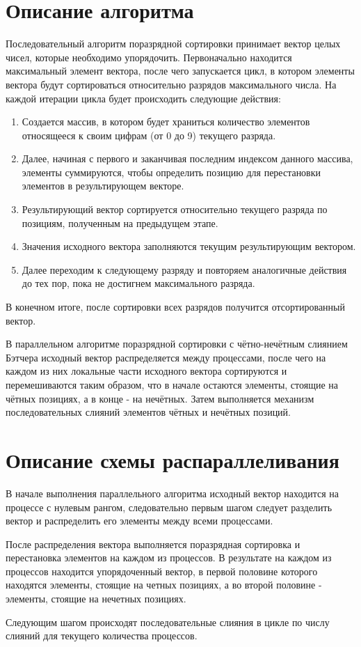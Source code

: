\documentclass{report}
\begin{document}
\section*{Описание алгоритма}
\par Последовательный алгоритм поразрядной сортировки принимает вектор целых чисел, которые необходимо упорядочить. Первоначально находится максимальный элемент вектора, после чего запускается цикл, в котором элементы вектора будут сортироваться относительно разрядов максимального числа. На каждой итерации цикла будет происходить следующие действия:
\begin{enumerate}
\item Создается массив, в котором будет храниться количество элементов относящееся к своим цифрам (от 0 до 9) текущего разряда.
\item Далее, начиная с первого и заканчивая последним индексом данного массива, элементы суммируются, чтобы определить позицию для перестановки элементов в результирующем векторе.
\item Результирующий вектор сортируется относительно текущего разряда по позициям, полученным на предыдущем этапе.
\item Значения исходного вектора заполняются текущим результирующим вектором.
\item Далее переходим к следующему разряду и повторяем аналогичные действия до тех пор, пока не достигнем максимального разряда.
\end{enumerate}
В конечном итоге, после сортировки всех разрядов получится отсортированный вектор.
\par В параллельном алгоритме поразрядной сортировки с чётно-нечётным слиянием Бэтчера исходный вектор распределяется между процессами, после чего на каждом из них локальные части исходного вектора сортируются и перемешиваются таким образом, что в начале остаются элементы, стоящие на чётных позициях, а в конце - на нечётных. Затем выполняется механизм последовательных слияний элементов чётных и нечётных позиций.
\newpage

\section*{Описание схемы распараллеливания}
\par В начале выполнения параллельного алгоритма исходный вектор находится на процессе с нулевым рангом, следовательно первым шагом следует разделить вектор и распределить его элементы между всеми процессами.
\par После распределения вектора выполняется поразрядная сортировка и перестановка элементов на каждом из процессов. В результате на каждом из процессов находится упорядоченный вектор, в первой половине которого находятся элементы, стоящие на четных позициях, а во второй половине - элементы, стоящие на нечетных позициях. 
\par Следующим шагом происходят последовательные слияния в цикле по числу слияний для текущего количества процессов. 
\end{document}
